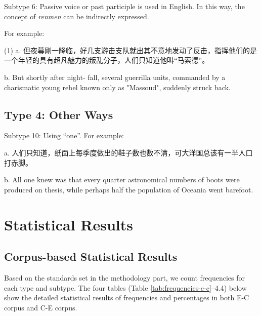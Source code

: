 \documentclass[degree=bachelor,language=english]{thuthesis}
\begin{document}
Subtype 6: Passive voice or past participle is used in English. In this way, the concept of \emph{renmen} can be indirectly expressed.

For example:

(1) a. 但夜幕刚一降临，好几支游击支队就出其不意地发动了反击，指挥他们的是一个年轻的具有超凡魅力的叛乱分子，人们只知道他叫“马索德”。

b. But shortly after night- fall, several guerrilla units, commanded by a charismatic young rebel known only as "Massoud", suddenly struck back.


\subsection{Type 4: Other Ways}

Subtype 10: Using “one”. For example:

a. 人们只知道，纸面上每季度做出的鞋子数也数不清，可大洋国总该有一半人口打赤脚。

b. All one knew was that every quarter astronomical numbers of boots were produced on thesis, while perhaps half the population of Oceania went barefoot.



\section{Statistical Results}

\subsection{Corpus-based Statistical Results}

Based on the standards set in the methodology part, we count frequencies for each type and subtype. The four tables (Table \ref{tab:frequencies-e-c}--4.4) below show the detailed statistical results of frequencies and percentages in both E-C corpus and C-E corpus.
\end{document}
